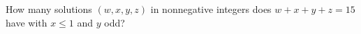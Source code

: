 How many solutions $(w,x,y,z)$ in nonnegative integers does $w+x+y+z=15$ have with $x\le1$ and $y$ odd?
